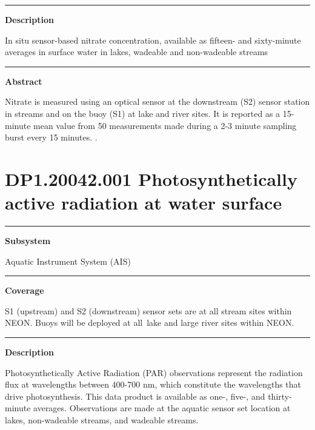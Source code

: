 \documentclass[]{article}
\begin{document}
\begin{center}\rule{0.5\linewidth}{\linethickness}\end{center}

\textbf{Description}

In situ sensor-based nitrate concentration, available as fifteen- and
sixty-minute averages in surface water in lakes, wadeable and
non-wadeable streams

\begin{center}\rule{0.5\linewidth}{\linethickness}\end{center}

\textbf{Abstract}

Nitrate is measured using an optical sensor at the downstream (S2)
sensor station in streams and on the buoy (S1) at lake and river sites.
It is reported as a 15-minute mean value from 50 measurements made
during a 2-3 minute sampling burst every 15 minutes. \newpage
.

\section{DP1.20042.001 Photosynthetically active radiation at water
surface}\label{dp1.20042.001-photosynthetically-active-radiation-at-water-surface}

\begin{center}\rule{0.5\linewidth}{\linethickness}\end{center}

\textbf{Subsystem}

Aquatic Instrument System (AIS)

\begin{center}\rule{0.5\linewidth}{\linethickness}\end{center}

\textbf{Coverage}

S1 (upstream) and S2 (downstream) sensor sets are at all stream sites
within NEON. Buoys will be deployed at all~lake and large river sites
within NEON.

\begin{center}\rule{0.5\linewidth}{\linethickness}\end{center}

\textbf{Description}

Photosynthetically Active Radiation (PAR) observations represent the
radiation flux at wavelengths between 400-700 nm, which constitute the
wavelengths that drive photosynthesis. This data product is available as
one-, five-, and thirty-minute averages. Observations are made at the
aquatic sensor set location at lakes, non-wadeable streams, and wadeable
streams.
\end{document}

